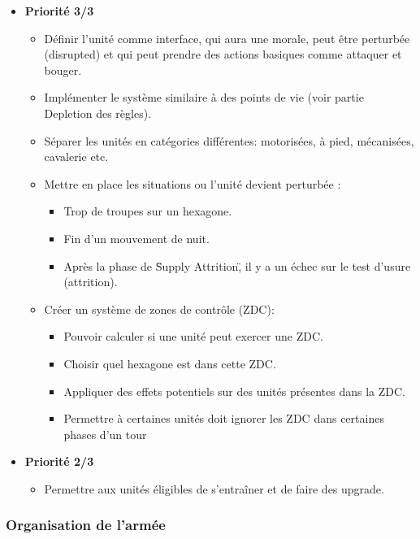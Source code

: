 \begin{itemize}
    \item \textbf{Priorité 3/3}
    \begin{itemize}
        \item Définir l'unité comme interface, qui aura une morale, peut être perturbée (disrupted) et qui peut prendre des actions basiques comme attaquer et bouger.\cmark
        \item Implémenter le système similaire à des points de vie (voir partie Depletion des règles).\cmark
        \item Séparer les unités en catégories différentes: motorisées, à pied, mécanisées, cavalerie etc.\cmark
        \item Mettre en place les situations ou l'unité devient perturbée :
        \begin{itemize}
            \item Trop de troupes sur un hexagone.
            \item Fin d'un mouvement de nuit.
            \item Après la phase de \"Supply Attrition\", il y a un échec sur le test d'usure (attrition).
        \end{itemize}
        \item Créer un système de zones de contrôle (ZDC):
        \begin{itemize}
            \item Pouvoir calculer si une unité peut exercer une ZDC.
            \item Choisir quel hexagone est dans cette ZDC.
            \item Appliquer des effets potentiels sur des unités présentes dans la ZDC.
            \item Permettre à certaines unités doit ignorer les ZDC dans certaines phases d'un tour
        \end{itemize}
    \end{itemize}
    \item \textbf{Priorité 2/3}
    \begin{itemize}
        \item Permettre aux unités éligibles de s'entraîner et de faire des upgrade.\xmark
    \end{itemize}
\end{itemize}

\subsubsection{Organisation de l'armée}


